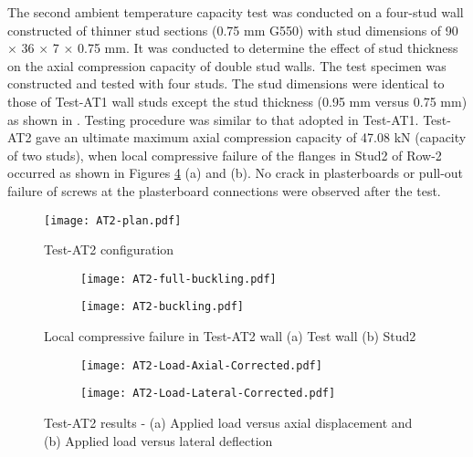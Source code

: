 The second ambient temperature capacity test was conducted on a four-stud wall constructed of thinner stud sections (0.75 mm G550) with stud dimensions of 90 $\times$ 36 $\times$ 7 $\times$ 0.75 mm. It was conducted to determine the effect of stud thickness on the axial compression capacity of double stud walls. The test specimen was constructed and tested with four studs. The stud dimensions were identical to those of Test-AT1 wall studs except the stud thickness (0.95 mm versus 0.75 mm) as shown in . Testing procedure was similar to that adopted in Test-AT1. Test-AT2 gave an ultimate maximum axial compression capacity of 47.08 kN (capacity of two studs), when local compressive failure of the flanges in Stud2 of Row-2 occurred as shown in Figures \ref{fig:AT2-failure} (a) and (b). No crack in plasterboards or pull-out failure of screws at the plasterboard connections were observed after the test.  
\begin{figure}[!htbp]
	\centering
			\texttt{[image: AT2-plan.pdf]}\\
		\caption{Test-AT2 configuration}
		\label{fig:AT2-plan}
\end{figure}  
\begin{figure}[!htbp]
	\centering
	\begin{subfigure}[b]{0.4\textwidth}
		\centering
		\texttt{[image: AT2-full-buckling.pdf]}
		\caption{}
		\label{subfig:AT2-full-buckling}
	\end{subfigure}
	\begin{subfigure}[b]{0.4\textwidth}
		\centering
		\texttt{[image: AT2-buckling.pdf]}
		\caption{}
		\label{subfig:AT2-buckling}
	\end{subfigure}
	   \caption{Local compressive failure in Test-AT2 wall (a) Test wall (b) Stud2}
	   \label{fig:AT2-failure}
\end{figure}
\begin{figure}[!htbp]
	\centering
	\begin{subfigure}[b]{0.7\textwidth}
		\centering
		\texttt{[image: AT2-Load-Axial-Corrected.pdf]}
		\caption{}
		\label{subfig:AT2-Load-Axial-Corrected}
	\end{subfigure}
	\begin{subfigure}[b]{0.7\textwidth}
		\centering
		\texttt{[image: AT2-Load-Lateral-Corrected.pdf]}
		\caption{}
		\label{subfig:AT2-Load-Lateral-Corrected}
	\end{subfigure}
	   \caption{Test-AT2 results - (a) Applied load versus axial displacement and (b) Applied load versus lateral deflection}
	   \label{fig:AT2-results}
\end{figure}


